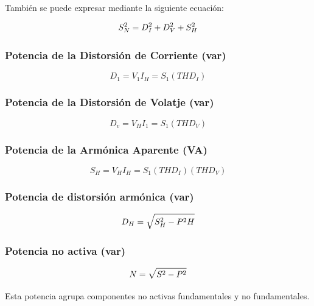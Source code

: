 También se puede expresar mediante la siguiente ecuación:

\begin{equation}\label{EQ30}
S^2_{N}=D^2_{I}+D^2_{V}+S^2_{H}\\
\end{equation}

\subsubsection{Potencia de la Distorsión de Corriente (var)}
\begin{equation} \label{EQ60}
D_{1}=V_{1}I_{H}=S_{1}(THD_{I})
\end{equation}

\subsubsection{Potencia de la Distorsión de Volatje (var)}
\begin{equation} \label{EQ61}
D_{v}=V_{H}I_{1}=S_{1}(THD_{V})
\end{equation}

\subsubsection{Potencia de la Armónica Aparente (VA)}
\begin{equation} \label{EQ62}
S_{H}=V_{H}I_{H}=S_{1}(THD_{I})(THD_{V})
\end{equation}


\subsubsection{Potencia de distorsión armónica (var)}

\begin{equation}\label{EQ31}
D_{H}=\sqrt{S^2_{H}-P^2{H}}\\
\end{equation}

\subsubsection{Potencia no activa (var)}

\begin{equation}\label{EQ32}
N=\sqrt{S^2-P^2}\\
\end{equation}

Esta potencia agrupa componentes no activas fundamentales y no fundamentales.\cite{A30}\\

